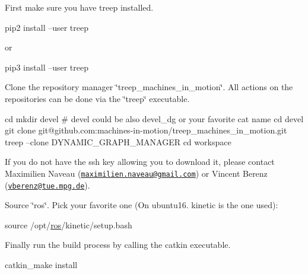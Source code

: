 \begin{DoxyEnumerate}
\item First make sure you have treep installed. 
\begin{DoxyCode}
pip2 install --user treep
\end{DoxyCode}
 or 
\begin{DoxyCode}
pip3 install --user treep
\end{DoxyCode}

\item Clone the repository manager \char`\"{}treep\+\_\+machines\+\_\+in\+\_\+motion\char`\"{}. All actions on the repositories can be done via the \char`\"{}treep\char`\"{} executable. 
\begin{DoxyCode}
cd
mkdir devel # devel could be also devel\_dg or your favorite cat name
cd devel
git clone git@github.com:machines-in-motion/treep\_machines\_in\_motion.git
treep --clone DYNAMIC\_GRAPH\_MANAGER
cd workspace
\end{DoxyCode}
 If you do not have the ssh key allowing you to download it, please contact Maximilien Naveau (\href{mailto:maximilien.naveau@gmail.com}{\tt maximilien.\+naveau@gmail.\+com}) or Vincent Berenz (\href{mailto:vberenz@tue.mpg.de}{\tt vberenz@tue.\+mpg.\+de}).
\item Source \char`\"{}ros\char`\"{}. Pick your favorite one (On ubuntu16. kinetic is the one used)\+: 
\begin{DoxyCode}
source /opt/\hyperlink{namespaceros}{ros}/kinetic/setup.bash
\end{DoxyCode}

\item Finally run the build process by calling the catkin executable. 
\begin{DoxyCode}
catkin\_make install
\end{DoxyCode}
 
\end{DoxyEnumerate}